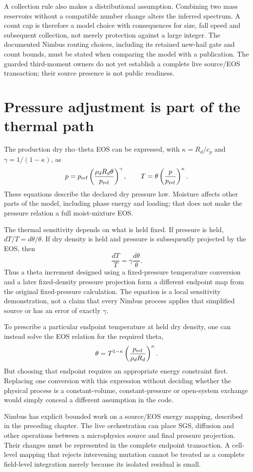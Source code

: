A collection rule also makes a distributional assumption. Combining two mass
reservoirs without a compatible number change alters the inferred spectrum.
A count cap is therefore a model choice with consequences for size, fall speed
and subsequent collection, not merely protection against a large integer.
The documented Nimbus routing choices, including its retained new-hail gate
and count bounds, must be stated when comparing the model with a publication.
The guarded third-moment owners do not yet establish a complete live
source/EOS transaction; their source presence is not public readiness.

\section{Pressure adjustment is part of the thermal path}

The production dry rho--theta EOS can be expressed, with
$\kappa=R_d/c_p$ and $\gamma=1/(1-\kappa)$, as
\[
 p=p_{\rm ref}\left(\frac{\rho_dR_d\theta}{p_{\rm ref}}\right)^\gamma,
 \qquad T=\theta\left(\frac{p}{p_{\rm ref}}\right)^\kappa.
\]
These equations describe the declared dry pressure law. Moisture affects other
parts of the model, including phase energy and loading; that does not make the
pressure relation a full moist-mixture EOS.

The thermal sensitivity depends on what is held fixed. If pressure is held,
$dT/T=d\theta/\theta$. If dry density is held and pressure is subsequently
projected by the EOS, then
\[
 \frac{dT}{T}=\gamma\frac{d\theta}{\theta}.
\]
Thus a theta increment designed using a fixed-pressure temperature conversion
and a later fixed-density pressure projection form a different endpoint map
from the original fixed-pressure calculation. The equation is a local
sensitivity demonstration, not a claim that every Nimbus process applies that
simplified source or has an error of exactly $\gamma$.

To prescribe a particular endpoint temperature at held dry density, one can
instead solve the EOS relation for the required theta,
\[
 \theta=T^{1-\kappa}
        \left(\frac{p_{\rm ref}}{\rho_dR_d}\right)^\kappa.
\]
But choosing that endpoint requires an appropriate energy constraint first.
Replacing one conversion with this expression without deciding whether the
physical process is a constant-volume, constant-pressure or open-system
exchange would simply conceal a different assumption in the code.

Nimbus has explicit bounded work on a source/EOS energy mapping, described in
the preceding chapter. The live orchestration can place SGS, diffusion and
other operations between a microphysics source and final pressure projection.
Their changes must be represented in the complete endpoint transaction. A
cell-level mapping that rejects intervening mutation cannot be treated as a
complete field-level integration merely because its isolated residual is small.

